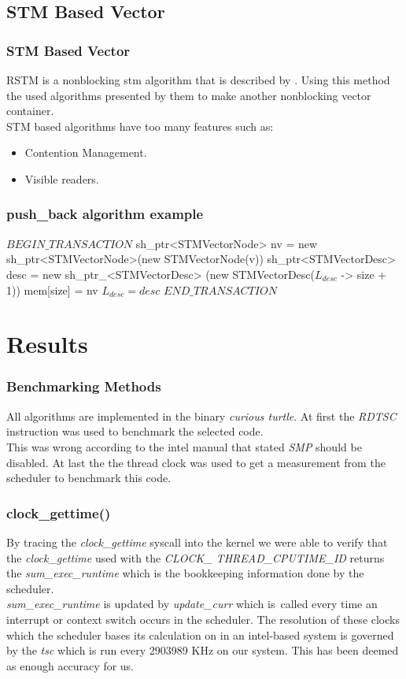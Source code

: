 \documentclass{beamer}
\begin{document}
\subsection{STM Based Vector}
\begin{frame}
    \frametitle{STM Based Vector}
    RSTM is a nonblocking stm algorithm that is described
    by \cite{marathe2006lowering}. Using this method the \cite{dechev2006lock}
    used algorithms presented by them to make another nonblocking vector
    container. \\
    STM based algorithms have too many features such as:
    \begin{itemize}
        \item Contention Management.
        \item Visible readers.
    \end{itemize}

\end{frame}

\begin{frame}
    \frametitle{push\_back algorithm example}
    \begin{algorithmic}
        \State $BEGIN\_TRANSACTION$
        \State sh\_ptr<STMVectorNode> nv = new sh\_ptr<STMVectorNode>(new
         STMVectorNode(v))
        \State sh\_ptr<STMVectorDesc> desc = new sh\_ptr\_<STMVectorDesc>
        (new STMVectorDesc($L_{desc}$ -> size + 1))
        \State mem[size] = nv
        \State $L_{desc} = desc$
        \State $END\_TRANSACTION$
    \end{algorithmic}
\end{frame}

\section{Results}
\begin{frame}
    \frametitle{Benchmarking Methods}
    All algorithms are implemented in the binary \textit{curious turtle}.
    At first the \textit{RDTSC} instruction was used to benchmark the
    selected code. \\
    This was wrong according to the intel manual that stated \textit{SMP}
    should be disabled.
    At last the the thread clock was used to get a measurement from the
    scheduler to benchmark this code.
\end{frame}

\begin{frame}
    \frametitle{clock\_gettime()}
    By tracing the \textit{clock\_gettime} syscall into the kernel we were able 
    to verify that the \textit{clock\_gettime} used with the \textit{CLOCK\_
    THREAD\_CPUTIME\_ID} returns the \textit{sum\_exec\_runtime} which is the
    bookkeeping information done by the scheduler. \\
    \textit{sum\_exec\_runtime} is updated by \textit{update\_curr} which is\
    called every time an interrupt or context switch occurs in the scheduler.
    The resolution of these clocks which the scheduler
    bases its calculation on in an intel-based system is
    governed by the \textit{tsc} which is run every 2903989 KHz on our system.
    This has been deemed as enough accuracy for us.
\end{frame}
\end{document}
